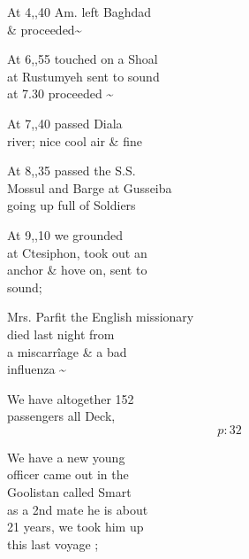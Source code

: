 \documentclass{report}
\begin{document}
	\par{
 	At 4,,40 Am. left Baghdad\ \\\& proceeded\~{}\ \\
	}

	\par{
 	At 6,,55 touched on a Shoal\ \\at Rustumyeh sent to sound\ \\at 7.30 proceeded \~{}\ \\
	}

	\par{
 	At 7,,40 passed Diala\ \\river; nice cool air \& fine\ \\
	}

	\par{
 	At 8,,35 passed the S.S.\ \\Mossul and Barge at Gusseiba\ \\going up full of Soldiers\ \\
	}

	\par{
 	At 9,,10 we grounded\ \\at Ctesiphon, took out an\ \\anchor \& hove on, sent to\ \\sound;\ \\
	}

	\par{
 	Mrs. Parfit the English missionary\ \\died last night from\ \\a miscarrîage \& a bad\ \\influenza \~{}\ \\
	}

	\par{
 	We have altogether 152\ \\passengers all Deck,\ \\
  \[p: 32 \]

	}


	\par{
 	We have a new young\ \\officer came out in the\ \\Goolistan called Smart\ \\as a 2nd mate he is about\ \\21 years, we took him up\ \\this last voyage ;\ \\
	}
\end{document}
